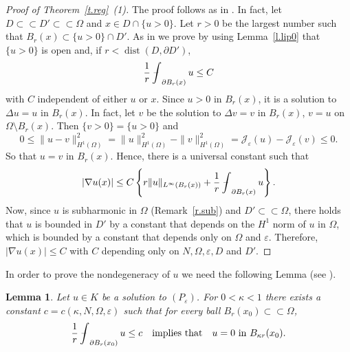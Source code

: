 \documentclass[11pt]{amsart}
\newtheorem{lemma}{Lemma}[section]
\theoremstyle{definition}
\theoremstyle{remark}
\numberwithin{equation}{section}
\newcommand{\cJ}{\mathcal{J}}
\DeclareMathOperator{\dist}{dist}
\newcommand{\avint}{\mathop{\,\rlap{--}\!\!\int}\nolimits}
\begin{document}
\begin{proof}[Proof of Theorem~\ref{t.reg}~(1)]
The proof follows as in \cite[Lemma~3.3]{AC}. In fact, let $D\subset\subset D'\subset\subset\Omega$ and $x\in D\cap\{u>0\}$. Let $r>0$ be the largest number such that $B_r(x)\subset\{u>0\}\cap D'$. As in \cite{AC} we prove by using Lemma~\ref{l.lip0} that $\{u>0\}$ is open and, if $r<\dist(D,\partial D')$,
\[
\frac1r\avint_{\partial B_r(x)}u\le C
\]
with $C$ independent of either $u$ or $x$. Since $u>0$ in $B_r(x)$, it is a solution to $\Delta u=u$ in $B_r(x)$. In fact, let $v$ be the solution to $\Delta v=v$ in $B_r(x)$, $v=u$ on $\Omega\setminus B_r(x)$. Then $\{v>0\}=\{u>0\}$ and
\[
0\le\|u-v\|^2_{H^1(\Omega)}=\|u\|^2_{H^1(\Omega)}-\|v\|^2_{H^1(\Omega)}=\cJ_\varepsilon(u)-\cJ_\varepsilon(v)\le0.
\]
So that $u=v$ in $B_r(x)$. Hence, there is a universal constant such that
\[
|\nabla u(x)|\le C\left\{r\|u\|_{L^\infty(B_r(x))}+\frac1r\avint_{\partial B_r(x)}u\right\}.
\]
Now, since $u$ is subharmonic in $\Omega$ (Remark~\ref{r.sub}) and $D'\subset\subset\Omega$, there holds that $u$ is bounded in $D'$ by a constant that depends on the $H^1$ norm of $u$ in $\Omega$, which is bounded by a constant that depends only on $\Omega$ and $\varepsilon$. Therefore, $|\nabla u(x)|\le C$ with $C$ depending only on $N,\Omega,\varepsilon,D$ and $D'$.
\end{proof}

In order to prove the nondegeneracy of $u$ we need the following Lemma (see \cite[Lemma~3.4]{AC}).

\begin{lemma}\label{l.nondeg}
Let $u\in K$ be a solution to $(P_\varepsilon)$. For $0<\kappa<1$ there exists a constant $c=c(\kappa,N,\Omega,\varepsilon)$ such that for every ball $B_r(x_0)\subset\subset\Omega$,
\[
\frac1r\avint_{\partial B_r(x_0)}u\le c\quad\text{implies that}\quad u=0\ \text{in }B_{\kappa r}(x_0).
\]
\end{lemma}
\end{document}
